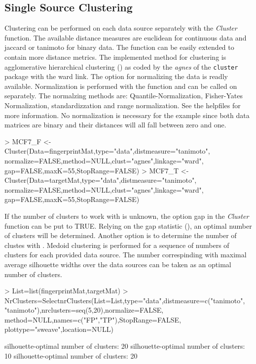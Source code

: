 \documentclass[a4paper]{article}
\begin{document}
\subsection{Single Source Clustering}
Clustering can be performed on each data source separately with the {\it
Cluster} function. The available distance measures are euclidean for continuous
data and jaccard or tanimoto for binary data. The function can be easily
extended to contain more distance metrics. The implemented method for
clustering is agglomerative hierarchical clustering (\cite{Hastie2009}) as coded
by the {\it agnes} of the \texttt{cluster} package with the ward link. The
option for normalizing the data is readly available. Normalization is performed
with the  function and can be called on separately. The
normalzing methods are: Quantile-Normalization, Fisher-Yates Normalization,
standardizzation and range normalization. See the helpfiles for more
information. No normalization is necessary for the example since both data
matrices are binary and their distances will all fall between zero and one.
\begin{Schunk}
\begin{Sinput}
> MCF7_F <- Cluster(Data=fingerprintMat,type="data",distmeasure="tanimoto", 
                   normalize=FALSE,method=NULL,clust="agnes",linkage="ward",
                   gap=FALSE,maxK=55,StopRange=FALSE) 
> MCF7_T <- Cluster(Data=targetMat,type="data",distmeasure="tanimoto",
                   normalize=FALSE,method=NULL,clust="agnes",linkage="ward",
                   gap=FALSE,maxK=55,StopRange=FALSE)
\end{Sinput}
\end{Schunk}
\noindent If the number of clusters to work with is unknown, the option gap in
the {\it Cluster} function can be put to TRUE. Relying on the gap statistic
(\cite{Hastie2009}), an optimal number of clusters will be determined. Another
option is to determine the number of clustes with .
Medoid clustering is performed for a sequence of numbers of clusters for each
provided data source. The number correspinding with maximal average silhouette
widths over the data sources can be taken as an optimal number of clusters.
\begin{Schunk}
\begin{Sinput}
> List=list(fingerprintMat,targetMat)
> NrClusters=SelectnrClusters(List=List,type="data",distmeasure=c("tanimoto",
                             "tanimoto"),nrclusters=seq(5,20),normalize=FALSE,
                              method=NULL,names=c("FP","TP"),StopRange=FALSE,
                              plottype="sweave",location=NULL)
\end{Sinput}
\begin{Soutput}
silhouette-optimal number of clusters: 20 
silhouette-optimal number of clusters: 10 
silhouette-optimal number of clusters: 20 
\end{Soutput}
\end{Schunk}
\end{document}
